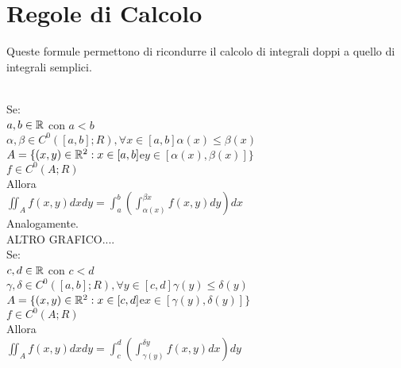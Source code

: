 \section{Regole di Calcolo}
Queste formule permettono di ricondurre il calcolo di integrali doppi a quello di integrali semplici.\\
\\
Se:\\
$a,b\in \mathbb{R}$ con $a<b$\\
$\alpha,\beta\in C^0([a,b];R), \forall x\in[a,b] \alpha(x)\le\beta(x)$\\
$A=\{(x,y)\in \mathbb{R}^2: x\in [a,b] $e$ y\in [\alpha(x),\beta(x)] \}$\\
$f\in C^0(A;R)$\\
Allora\\
$\iint_Af(x,y)dxdy=\int_a^b\left(\int_{\alpha(x)}^{\beta{x}}f(x,y)dy\right)dx$\\
Analogamente.\\
ALTRO GRAFICO....\\
Se:\\
$c,d\in \mathbb{R}$ con $c<d$\\
$\gamma,\delta\in C^0([a,b];R), \forall y\in[c,d] \gamma(y)\le\delta(y)$\\
$A=\{(x,y)\in \mathbb{R}^2: x\in [c,d] $e$ x\in [\gamma(y),\delta(y)] \}$\\
$f\in C^0(A;R)$\\
Allora\\
$\iint_Af(x,y)dxdy=\int_c^d\left(\int_{\gamma(y)}^{\delta{y}}f(x,y)dx\right)dy$
